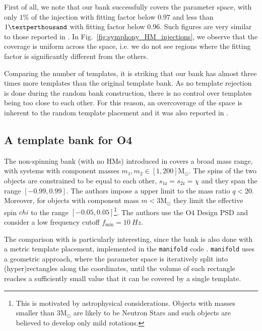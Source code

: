 \documentclass[twocolumn,showpacs,preprintnumbers,nofootinbib,prd,
superscriptaddress,10pt]{revtex4-2}
\begin{document}
First of all, we note that our bank successfully covers the parameter space, with only $1\%$ of the injection with fitting factor below $0.97$ and less than $1\textperthousand$ with fitting factor below $0.96$. Such figures are very similar to those reported in \cite{Harry:2017weg}.
In Fig.~\ref{fig:symphony_HM_injections}, we observe that the coverage is uniform across the space, i.e. we do not see regions where the fitting factor is significantly different from the others.

Comparing the number of templates, it is striking that our bank has almost three times more templates than the original template bank.
As no template rejection is done during the random bank construction, there is no control over templates being too close to each other. For this reason, an overcoverage of the space is inherent to the random template placement and it was also reported in \cite{Messenger:2008ta,Coogan:2022qxs}.

\subsection{A template bank for O4} \label{sec:all_sky_comparison}

The non-spinning bank (with no HMs) introduced in \cite{Sakon:2022ibh} covers a broad mass range, with systems with component masses $m_1, m_2 \in [1,200] \mathrm{M_\odot}$. The spins of the two objects are constrained to be equal to each other, $s_\text{1z} = s_\text{2z} = \chi$ and they span the range $[-0.99, 0.99]$.
The authors impose a upper limit to the mass ratio $q<20$. Moreover, for objects with component mass $m<3  \mathrm{M_\odot}$ they limit the effective spin $chi$ to the range $[-0.05, 0.05]$\footnote{This is motivated by astrophysical considerations. Objects with masses smaller than $3  \mathrm{M_\odot}$ are likely to be Neutron Stars and such objects are believed to develop only mild rotations.}.
The authors use the O4 Design PSD \cite{} and consider a low frequency cutoff $f_\text{min} = \SI{10}{Hz}$.

The comparison with \cite{Sakon:2022ibh} is particularly interesting, since the bank is also done with a metric template placement, implemented in the \texttt{manifold} code \cite{Hanna:2022zpk}. \texttt{manifold} uses a geometric approach, where the parameter space is iteratively split into (hyper)rectangles along the coordinates, until the volume of each rectangle reaches a sufficiently small value that it can be covered by a single template.
\end{document}
